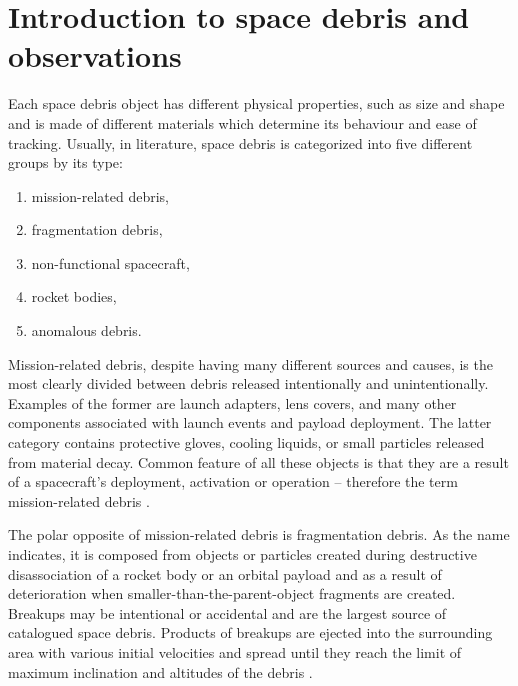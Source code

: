 \chapter{Introduction to space debris and observations}\label{chap:introduction}
	Each space debris object has different physical properties, such as size and shape and is made of different materials which determine its behaviour and ease of tracking. Usually, in literature, space debris is categorized into five different groups by its type:
	
\begin{enumerate}
	\item mission-related debris,
	\item fragmentation debris,
	\item non-functional spacecraft,
	\item rocket bodies,
	\item anomalous debris.
\end{enumerate}

	Mission-related debris, despite having many different sources and causes, is the most clearly divided between debris released intentionally and unintentionally. Examples of the former are launch adapters, lens covers, and many other components associated with launch events and payload deployment. The latter category contains protective gloves, cooling liquids, or small particles released from material decay. Common feature of all these objects is that they are a result of a spacecraft's deployment, activation or operation -- therefore the term mission-related debris \citep{klinkrad2006space}. 
	
	The polar opposite of mission-related debris is fragmentation debris. As the name indicates, it is composed from objects or particles created during destructive disassociation of a rocket body or an orbital payload and as a result of deterioration when smaller-than-the-parent-object fragments are created. Breakups may be intentional or accidental and are the largest source of catalogued space debris. Products of breakups are ejected into the surrounding area with various initial velocities and spread until they reach the limit of maximum inclination and altitudes of the debris \citep{united1999technical}.
	
